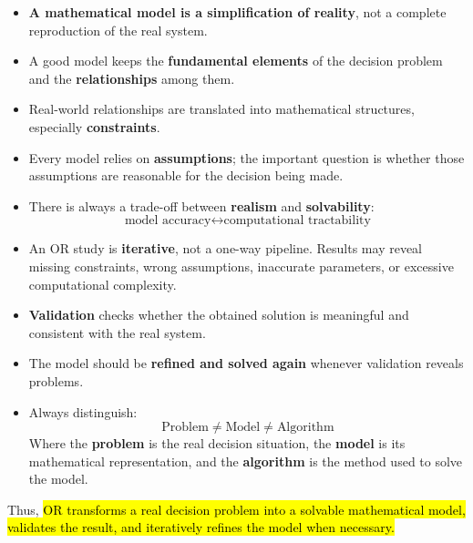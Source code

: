 \highspace
\begin{takeawaysbox}
    \begin{itemize}
        \item \textbf{A mathematical model is a simplification of reality}, not a complete reproduction of the real system.
        \item A good model keeps the \textbf{fundamental elements} of the decision problem and the \textbf{relationships} among them.
        \item Real-world relationships are translated into mathematical structures, especially \textbf{constraints}.
        \item Every model relies on \textbf{assumptions}; the important question is whether those assumptions are reasonable for the decision being made.
        \item There is always a trade-off between \textbf{realism} and \textbf{solvability}:
            \begin{equation*}
                \boxed{\text{model accuracy} \leftrightarrow \text{computational tractability}}
            \end{equation*}
        \item An OR study is \textbf{iterative}, not a one-way pipeline. Results may reveal missing constraints, wrong assumptions, inaccurate parameters, or excessive computational complexity.
        \item \textbf{Validation} checks whether the obtained solution is meaningful and consistent with the real system.
        \item The model should be \textbf{refined and solved again} whenever validation reveals problems.
        \item Always distinguish:
            \begin{equation*}
                \boxed{\text{Problem} \neq \text{Model} \neq \text{Algorithm}}
            \end{equation*}
            Where the \textbf{problem} is the real decision situation, the \textbf{model} is its mathematical representation, and the \textbf{algorithm} is the method used to solve the model.
    \end{itemize}
    Thus, \hl{OR transforms a real decision problem into a solvable mathematical model, validates the result, and iteratively refines the model when necessary.}
\end{takeawaysbox}